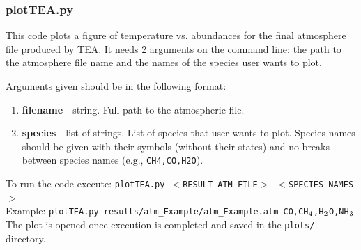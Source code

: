 \subsubsection{plotTEA.py}
This code plots a figure of temperature vs. abundances for the final
atmosphere file produced by TEA. It needs 2 arguments on the command
line: the path to the atmosphere file name and the names of the
species user wants to plot.

Arguments given should be in the following format: {
\begin{enumerate}
\setlength\itemsep{0ex}
\setlength\topsep{0ex}
\setlength\partopsep{0ex}
\setlength\parsep{0ex}

   \item {\bf filename} - string. Full path to the atmospheric
   file.  \item {\bf species} - list of strings. List of species that
   user wants to plot. Species names should be given with their
   symbols (without their states) and no breaks between species names
   (e.g., \texttt{CH4,CO,H2O}).
\end{enumerate}
}

To run the code execute: \texttt{plotTEA.py $<$RESULT\_ATM\_FILE$>$
$<$SPECIES\_NAMES$>$} \\ Example: \texttt{plotTEA.py
results/atm\_Example/atm\_Example.atm
CO,CH$\sb{4}$,H$\sb{2}$O,NH$\sb{3}$} The plot is opened once execution
is completed and saved in the \texttt{plots/} directory.


{\footnotesize

}


\actcharon
\mathshifton

\pagebreak



















